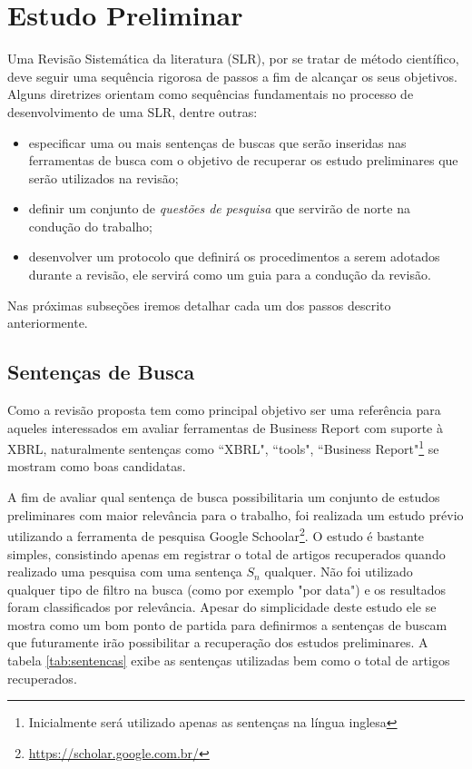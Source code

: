 \documentclass{article}
\begin{document}
\section{Estudo Preliminar}
\label{sec:rsl}

Uma Revisão Sistemática da literatura (SLR), por se tratar de método
científico, deve seguir uma sequência rigorosa de passos a fim de
alcançar os seus objetivos. Alguns diretrizes orientam como sequências
fundamentais no processo de desenvolvimento de uma
SLR\cite{keele2007guidelines}, dentre outras: 
\begin{itemize}
  \item especificar uma ou mais sentenças de buscas que serão
    inseridas nas ferramentas de busca com o objetivo de recuperar os
    estudo preliminares que serão utilizados na revisão;
  \item definir um conjunto de \textit{questões de pesquisa} que
    servirão de norte na condução do trabalho;
 \item  desenvolver um protocolo que definirá os procedimentos a serem adotados durante a revisão, ele servirá como um guia para a condução da revisão. 
\end{itemize}

Nas próximas subseções iremos detalhar cada um dos passos descrito anteriormente.
\subsection{Sentenças de Busca}
\label{subsec:setences}

Como a revisão proposta tem como principal objetivo ser uma referência para aqueles interessados em avaliar ferramentas de Business Report com suporte à XBRL, naturalmente sentenças como ``XBRL", ``tools", ``Business Report"\footnote{Inicialmente será utilizado apenas as sentenças na língua inglesa} se mostram como boas candidatas. 

A fim de avaliar qual sentença de busca possibilitaria um conjunto de
estudos preliminares com maior relevância para o trabalho, foi
realizada um estudo prévio utilizando a ferramenta de pesquisa Google
Schoolar\footnote{\url{https://scholar.google.com.br/}}. O estudo é
bastante simples, consistindo apenas em registrar o total de artigos
recuperados quando realizado uma pesquisa com uma sentença $S_n$
qualquer. Não foi utilizado qualquer tipo de filtro na busca (como por
exemplo "por data") e os resultados foram classificados por
relevância. Apesar do simplicidade deste estudo ele se mostra como um
bom ponto de partida para definirmos a sentenças de buscam que
futuramente irão possibilitar a recuperação dos estudos preliminares. A tabela \ref{tab:sentencas} exibe as sentenças utilizadas bem como o total de artigos recuperados.
\end{document}
